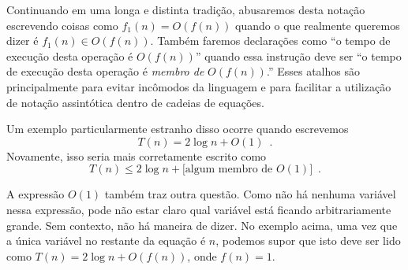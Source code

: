 Continuando em uma longa e distinta tradição, abusaremos desta 
notação escrevendo coisas como $f_1(n) = O(f(n))$ quando o que realmente 
queremos dizer é $f_1(n) \in O(f(n))$. Também faremos declarações como ``o 
tempo de execução desta operação é $O(f(n))$'' quando essa instrução deve 
ser ``o tempo de execução desta operação é \emph{membro de} $O(f(n))$.'' 
Esses atalhos são principalmente para evitar incômodos da linguagem e 
para facilitar a utilização de notação assintótica dentro de cadeias de
equações.

Um exemplo particularmente estranho disso ocorre quando escrevemos
\[
T(n) = 2\log n + O(1)  \enspace .
\]
Novamente, isso seria mais corretamente escrito como
\[
T(n) \le 2\log n + [\mbox{algum membro de $O(1)$]}  \enspace .
\]

A expressão $O(1)$ também traz outra questão. Como não há nenhuma variável 
nessa expressão, pode não estar claro qual variável está ficando 
arbitrariamente grande. Sem contexto, não há maneira de dizer. 
No exemplo acima, uma vez que a única variável no restante da equação 
é $n$, podemos supor que isto deve ser lido como $T(n) = 2\log n + 
O(f(n))$, onde $f(n) = 1$.


